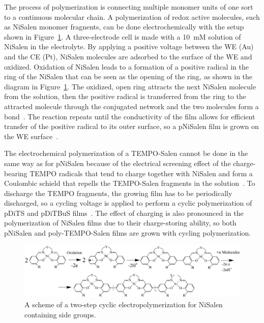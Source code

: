 The process of polymerization is connecting multiple monomer units of one sort to a continuous molecular chain. A polymerization of redox active molecules, such as NiSalen monomer fragnents, can be done electrochemically with the setup shown in Figure~\ref{fig:electropolymerization_reaction}. A three-electrode cell is made with a 10~mM solution of NiSalen in the electrolyte. By applying a positive voltage between the WE (Au) and the CE (Pt), NiSalen molecules are adsorbed to the surface of the WE and oxidized. Oxidation of NiSalen leads to a formation of a positive radical in the ring of the NiSalen that can be seen as the opening of the ring, as shown in the diagram in Figure~\ref{fig:electropolymerization_reaction}. The oxidized, open ring attracts the next NiSalen molecule from the solution, then the positive radical is transferred from the ring to the attracted molecule through the conjugated network and the two molecules form a bond~\cite{Koshika_2009}. The reaction repeats until the conductivity of the film allows for efficient transfer of the positive radical to its outer surface, so a pNiSalen film is grown on the WE surface~\cite{Apraksin2021,Novozhilova_2009Vereshchagin2020}.\\ 
\par
The electrochemical polymerization of a TEMPO-Salen cannot be done in the same way as for pNiSalen because of the electrical screening effect of the charge-bearing TEMPO radicals that tend to charge together with NiSalen and form a Coulombic schield that repells the TEMPO-Salen fragments in the solution~\cite{Vereshchagin2020}. To discharge the TEMPO fragments, the growing film has to be periodically discharged, so a cycling voltage is applied to perform a cyclic polymerization of pDiTS and pDiTBuS films~\cite{Vereshchagin2020,Kulikov2023}. The effect of charging is also pronounced in the polymerization of NiSalen films due to their charge-storing ability, so both pNiSalen and poly-TEMPO-Salen films are grown with cycling polymerization.\\

\begin{figure}[!ht]
\center
	\includegraphics[width=1\textwidth]{./electrochemistry/figures/electropolymerization_reaction.pdf}
	\caption{A scheme of a two-step cyclic electropolymerization for NiSalen containing side groups.}
	\label{fig:electropolymerization_reaction}
\end{figure}


